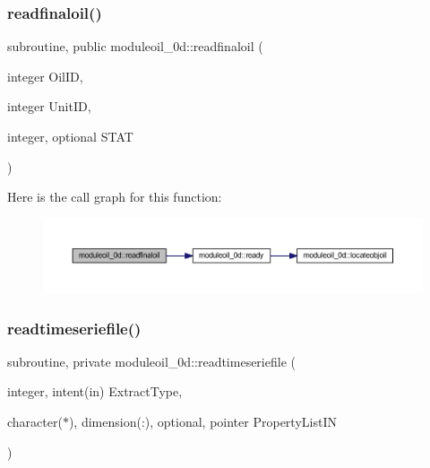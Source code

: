 \subsubsection{\texorpdfstring{readfinaloil()}{readfinaloil()}}
{\footnotesize\ttfamily subroutine, public moduleoil\+\_\+0d\+::readfinaloil (\begin{DoxyParamCaption}\item[{integer}]{Oil\+ID,  }\item[{integer}]{Unit\+ID,  }\item[{integer, optional}]{S\+T\+AT }\end{DoxyParamCaption})}

Here is the call graph for this function\+:\nopagebreak
\begin{figure}[H]
\begin{center}
\leavevmode
\includegraphics[width=350pt]{namespacemoduleoil__0d_aa7833f46fb80b6ff52234957c56b77d2_cgraph}
\end{center}
\end{figure}
\mbox{\label{namespacemoduleoil__0d_a3c2fbab1e96896178c05bcf889f853fc}} 
\subsubsection{\texorpdfstring{readtimeseriefile()}{readtimeseriefile()}}
{\footnotesize\ttfamily subroutine, private moduleoil\+\_\+0d\+::readtimeseriefile (\begin{DoxyParamCaption}\item[{integer, intent(in)}]{Extract\+Type,  }\item[{character($\ast$), dimension(\+:), optional, pointer}]{Property\+List\+IN }\end{DoxyParamCaption})\hspace{0.3cm}{\ttfamily [private]}}

